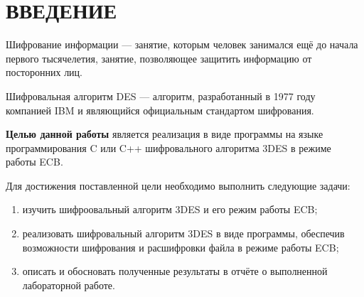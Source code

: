 \chapter*{ВВЕДЕНИЕ}

Шифрование информации --- занятие, которым человек занимался ещё до начала первого тысячелетия, занятие, позволяющее защитить информацию от посторонних лиц. 

Шифровальная алгоритм DES --- алгоритм, разработанный в 1977 году компанией IBM и являющийся официальным стандартом шифрования.

\textbf{Целью данной работы} является реализация в виде программы на языке программирования C или C++ шифровального алгоритма 3DES в режиме работы ECB. 

Для достижения поставленной цели необходимо выполнить следующие задачи:
\begin{enumerate}[label=\arabic*)]
	\item изучить шифроовальный алгоритм  3DES и его режим работы ECB;
	\item реализовать шифровальный алгоритм 3DES в виде программы, обеспечив возможности шифрования и расшифровки файла в режиме работы ECB;
	\item описать и обосновать полученные результаты в отчёте о выполненной лабораторной работе.
\end{enumerate}
